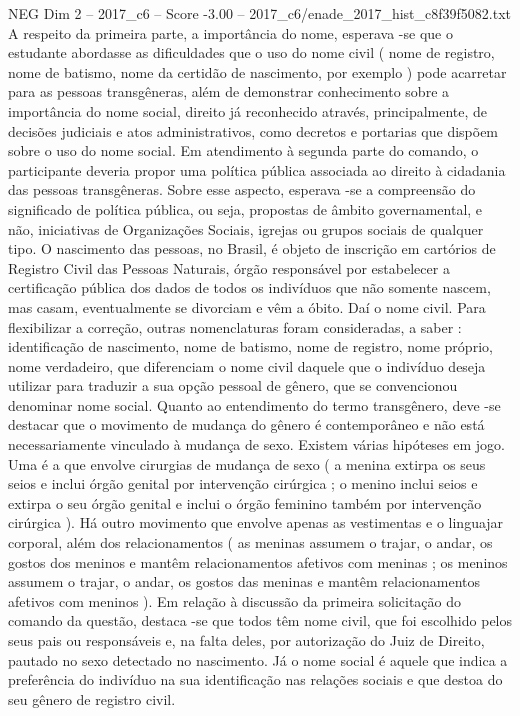 \begin{textsample}{NEG Dim 2 – 2017\_c6 – Score -3.00 – 2017\_c6/enade\_2017\_hist\_c8f39f5082.txt}
A respeito da primeira parte, a importância do nome, esperava -se que o estudante abordasse as dificuldades que o uso do nome civil ( nome de registro, nome de batismo, nome da certidão de nascimento, por exemplo ) pode acarretar para as pessoas transgêneras, além de demonstrar conhecimento sobre a importância do nome social, direito já reconhecido através, principalmente, de decisões judiciais e atos administrativos, como decretos e portarias que dispõem sobre o uso do nome social.
Em atendimento à segunda parte do comando, o participante deveria propor uma política pública associada ao direito à cidadania das pessoas transgêneras.
Sobre esse aspecto, esperava -se a compreensão do significado de política pública, ou seja, propostas de âmbito governamental, e não, iniciativas de Organizações Sociais, igrejas ou grupos sociais de qualquer tipo.
O nascimento das pessoas, no Brasil, é objeto de inscrição em cartórios de Registro Civil das Pessoas Naturais, órgão responsável por estabelecer a certificação pública dos dados de todos os indivíduos que não somente nascem, mas casam, eventualmente se divorciam e vêm a óbito.
Daí o nome civil.
Para flexibilizar a correção, outras nomenclaturas foram consideradas, a saber : identificação de nascimento, nome de batismo, nome de registro, nome próprio, nome verdadeiro, que diferenciam o nome civil daquele que o indivíduo deseja utilizar para traduzir a sua opção pessoal de gênero, que se convencionou denominar nome social.
Quanto ao entendimento do termo transgênero, deve -se destacar que o movimento de mudança do gênero é contemporâneo e não está necessariamente vinculado à mudança de sexo.
Existem várias hipóteses em jogo.
Uma é a que envolve cirurgias de mudança de sexo ( a menina extirpa os seus seios e inclui órgão genital por intervenção cirúrgica ; o menino inclui seios e extirpa o seu órgão genital e inclui o órgão feminino também por intervenção cirúrgica ).
Há outro movimento que envolve apenas as vestimentas e o linguajar corporal, além dos relacionamentos ( as meninas assumem o trajar, o andar, os gostos dos meninos e mantêm relacionamentos afetivos com meninas ; os meninos assumem o trajar, o andar, os gostos das meninas e mantêm relacionamentos afetivos com meninos ).
Em relação à discussão da primeira solicitação do comando da questão, destaca -se que todos têm nome civil, que foi escolhido pelos seus pais ou responsáveis e, na falta deles, por autorização do Juiz de Direito, pautado no sexo detectado no nascimento.
Já o nome social é aquele que indica a preferência do indivíduo na sua identificação nas relações sociais e que destoa do seu gênero de registro civil.

\end{textsample}
